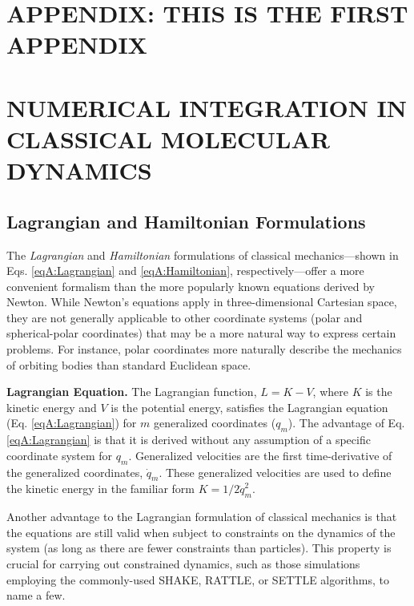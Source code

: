 {\chapter*{APPENDIX: THIS IS THE FIRST APPENDIX}
\setcounter{chapter}{1}}
{\chapter{NUMERICAL INTEGRATION IN CLASSICAL MOLECULAR DYNAMICS}}
\label{appendixA}

\section{Lagrangian and Hamiltonian Formulations}

The \emph{Lagrangian} and \emph{Hamiltonian} formulations of classical
mechanics---shown in Eqs. \ref{eqA:Lagrangian} and \ref{eqA:Hamiltonian},
respectively---offer a more convenient formalism than the more popularly known
equations derived by Newton. \cite{CorbenClassicalMechanics} While Newton's
equations apply in three-dimensional Cartesian space, they are not generally
applicable to other coordinate systems (\eg polar and spherical-polar
coordinates) that may be a more natural way to express certain problems. For
instance, polar coordinates more naturally describe the mechanics of orbiting
bodies than standard Euclidean space.

\textbf{Lagrangian Equation.} The Lagrangian function, $L = K - V$, where $K$ is
the kinetic energy and $V$ is the potential energy, satisfies the Lagrangian
equation (Eq.  \ref{eqA:Lagrangian}) for $m$ generalized coordinates ($q_m$).
The advantage of Eq. \ref{eqA:Lagrangian} is that it is derived without any
assumption of a specific coordinate system for $q_m$. Generalized velocities are
the first time-derivative of the generalized coordinates, $\dot q_m$. These
generalized velocities are used to define the kinetic energy in the familiar
form $K = 1/2 \dot q_m ^ 2$.

Another advantage to the Lagrangian formulation of classical mechanics is that
the equations are still valid when subject to constraints on the dynamics of the
system (as long as there are fewer constraints than particles).
\cite{CorbenClassicalMechanics} This property is crucial for carrying out
constrained dynamics, such as those simulations employing the commonly-used
SHAKE, \cite{Ryckaert_JComputPhys_1977_v23_p327} RATTLE, \cite{Andersen1983} or
SETTLE \cite{Miyamoto_JComputChem_1992_v13_p952} algorithms, to name a few.


